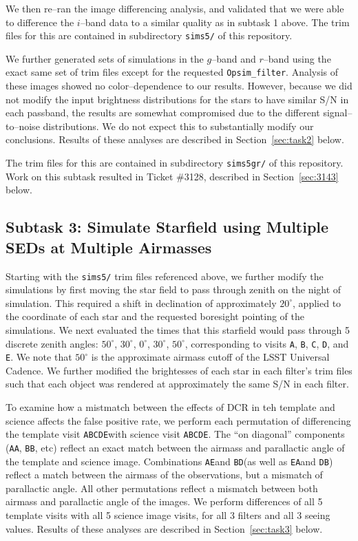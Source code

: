 \documentclass[prd, nofootinbib, floatfix, 11pt, tightenlines, times]{article}
\def\A{{\tt A}}
\def\B{{\tt B}}
\def\C{{\tt C}}
\def\D{{\tt D}}
\def\E{{\tt E}}
\begin{document}
We then re--ran the image differencing analysis, and validated that we
were able to difference the $i$--band data to a similar quality as in
subtask 1 above.  The trim files for this are contained in
subdirectory {\tt sims5/} of this repository.

We further generated sets of simulations in the $g$--band and
$r$--band using the exact same set of trim files except for the
requested {\tt Opsim\_filter}.  Analysis of these images showed no
color--dependence to our results.  However, because we did not modify
the input brightness distributions for the stars to have similar S/N
in each passband, the results are somewhat compromised due to the
different signal--to--noise distributions.  We do not expect this to
substantially modify our conclusions.  Results of these analyses are described in
Section~\ref{sec:task2} below.

The trim files for this are
contained in subdirectory {\tt sims5gr/} of this repository.
Work on this subtask resulted in Ticket \#3128, described in
Section~\ref{sec:3143} below.

\subsection{Subtask 3: Simulate Starfield using Multiple SEDs at Multiple Airmasses}

Starting with the {\tt sims5/} trim files referenced above, we further
modify the simulations by first moving the star field to pass through
zenith on the night of simulation.  This required a shift in
declination of approximately $20^{\circ}$, applied to the coordinate
of each star and the requested boresight pointing of the simulations.
We next evaluated the times that this starfield would pass through 5
discrete zenith angles: $50^{\circ}$, $30^{\circ}$, $0^{\circ}$,
$30^{\circ}$, $50^{\circ}$, corresponding to visits \A, \B, \C, \D,
and  \E.  We note that $50^{\circ}$ is the approximate airmass cutoff of
the LSST Universal Cadence.  We further modified the brightesses of each star in each filter's trim files 
such that each object was rendered at approximately the same S/N in each filter.  

To examine how a mistmatch between the effects of DCR in teh template
and science affects the false positive rate, we perform each
permutation of differencing the template visit \A\B\C\D\E with science
visit \A\B\C\D\E.  The ``on diagonal'' components (\A\A, \B\B, etc)
reflect an exact match between the airmass and parallactic angle of
the template and science image.  Combinations \A\E and \B\D (as well
as \E\A and \D\B) reflect a match between the airmass of the
observations, but a mismatch of parallactic angle.  All other
permutations reflect a mismatch between both airmass and parallactic
angle of the images.  We perform differences of all 5 template visits with all 5 science image visits,
for all 3 filters and all 3 seeing values.
Results of these analyses are described in
Section~\ref{sec:task3} below.
\end{document}
